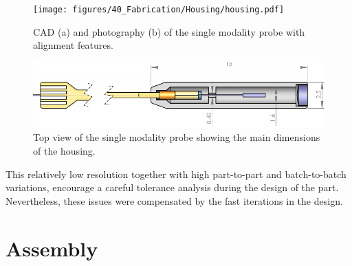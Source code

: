 \begin{figure}[h!]\centering \texttt{[image: figures/40\_Fabrication/Housing/housing.pdf]}
      \caption{CAD (a) and photography (b) of the single modality probe with alignment features.}
      \label{fig:housing}
\end{figure}

\begin{figure}[h!]\centering \includegraphics[width=\columnwidth]{figures/40_Fabrication/Housing/TopDrawing.pdf}
      \caption{Top view of the single modality probe showing the main dimensions of the housing.}
      \label{fig:housingDim}
\end{figure}

This relatively low resolution together with high part-to-part and batch-to-batch variations, encourage a careful tolerance analysis during the design of the part. Nevertheless, these issues were compensated by the fast iterations in the design.


%

\section{Assembly}

%


